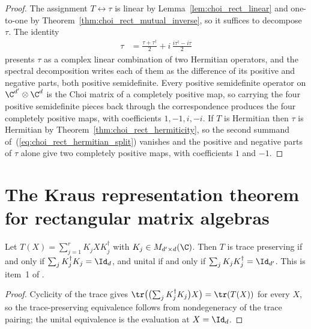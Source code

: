 \begin{proof}
    \leanok
    The assignment $T\leftrightarrow\tau$ is linear by
    Lemma~\ref{lem:choi_rect_linear} and one-to-one by
    Theorem~\ref{thm:choi_rect_mutual_inverse}, so it suffices to decompose
    $\tau$. The identity
    \begin{align}
        \tau
          &= \frac{\tau+\tau^\dagger}{2}
             + i\,\frac{i\tau^\dagger-i\tau}{2}
        \label{eq:choi_rect_hermitian_split}
    \end{align}
    presents $\tau$ as a complex linear combination of two Hermitian
    operators, and the spectral decomposition writes each of them as the
    difference of its positive and negative parts, both positive
    semidefinite. Every positive semidefinite operator on
    $\C^{d'}\otimes\C^{d}$ is the Choi matrix of a completely positive map, so
    carrying the four positive semidefinite pieces back through the
    correspondence produces the four completely positive maps, with
    coefficients $1,-1,i,-i$. If $T$ is Hermitian then $\tau$ is Hermitian by
    Theorem~\ref{thm:choi_rect_hermiticity}, so the second summand
    of~(\ref{eq:choi_rect_hermitian_split}) vanishes and the positive and
    negative parts of $\tau$ alone give two completely positive maps, with
    coefficients $1$ and $-1$.
\end{proof}

\section{The Kraus representation theorem for rectangular matrix algebras}

\begin{theorem}
    \label{thm:kraus_rect_normalization}
    \leanok
    Let $T(X)=\sum_{j=1}^{r}K_jXK_j^\dagger$ with
    $K_j\in M_{d'\times d}(\C)$. Then $T$ is trace preserving if and only
    if $\sum_j K_j^\dagger K_j=\Id_d$, and unital if and only if
    $\sum_j K_jK_j^\dagger=\Id_{d'}$. This is item~1 of
    \cite[Theorem~2.1]{Wolf2012Quantum}.
\end{theorem}

\begin{proof}
    \leanok
    Cyclicity of the trace gives
    $\tr\bigl(\bigl(\sum_j K_j^\dagger K_j\bigr)X\bigr)=\tr(T(X))$ for every
    $X$, so the trace-preserving equivalence follows from nondegeneracy of
    the trace pairing; the unital equivalence is the evaluation at $X=\Id_d$.
\end{proof}

